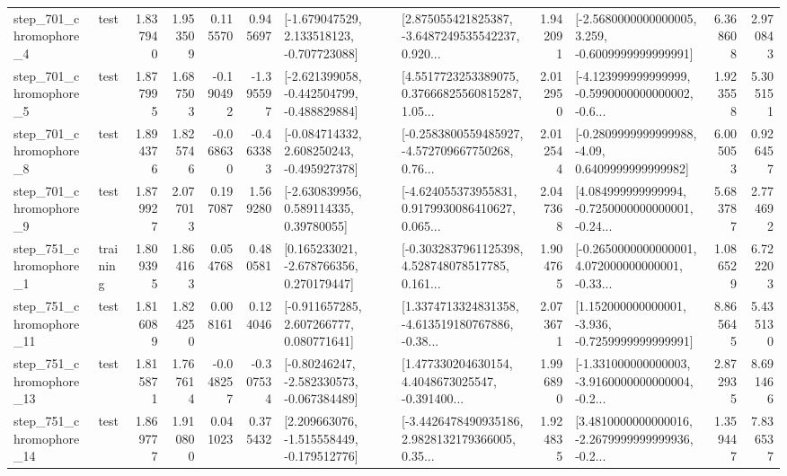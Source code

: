 \begin{tabular}{llrrrrllrlrr}
   step\_701\_chromophore\_4 &      test &      1.837940 &    1.953509 &      0.115570 &  0.945697 &   [-1.679047529, 2.133518123, -0.707723088] &  [2.875055421825387, -3.6487249535542237, 0.920... &       1.942091 &  [-2.5680000000000005, 3.259, -0.6009999999999991] &            6.368608 &          2.970843 \\
   step\_701\_chromophore\_5 &      test &      1.877995 &    1.687503 &     -0.190492 & -1.395597 &  [-2.621399058, -0.442504799, -0.488829884] &  [4.5517723253389075, 0.37666825560815287, 1.05... &       2.012950 &  [-4.123999999999999, -0.5990000000000002, -0.6... &            1.923558 &          5.305151 \\
   step\_701\_chromophore\_8 &      test &      1.894376 &    1.825746 &     -0.068630 & -0.463383 &   [-0.084714332, 2.608250243, -0.495927378] &  [-0.2583800559485927, -4.572709667750268, 0.76... &       2.012544 &   [-0.2809999999999988, -4.09, 0.6409999999999982] &            6.005053 &          0.926457 \\
   step\_701\_chromophore\_9 &      test &      1.879927 &    2.077013 &      0.197087 &  1.569280 &     [-2.630839956, 0.589114335, 0.39780055] &  [-4.624055373955831, 0.9179930086410627, 0.065... &       2.047368 &  [4.084999999999994, -0.7250000000000001, -0.24... &            5.683787 &          2.774692 \\
   step\_751\_chromophore\_1 &  training &      1.809395 &    1.864163 &      0.054768 &  0.480581 &    [0.165233021, -2.678766356, 0.270179447] &  [-0.3032837961125398, 4.528748078517785, 0.161... &       1.904765 &  [-0.2650000000000001, 4.072000000000001, -0.33... &            1.086529 &          6.722203 \\
  step\_751\_chromophore\_11 &      test &      1.816089 &    1.824250 &      0.008161 &  0.124046 &    [-0.911657285, 2.607266777, 0.080771641] &  [1.3374713324831358, -4.613519180767886, -0.38... &       2.073671 &   [1.152000000000001, -3.936, -0.7259999999999991] &            8.865645 &          5.435130 \\
  step\_751\_chromophore\_13 &      test &      1.815871 &    1.767614 &     -0.048257 & -0.307534 &   [-0.80246247, -2.582330573, -0.067384489] &  [1.477330204630154, 4.4048673025547, -0.391400... &       1.996890 &  [-1.331000000000003, -3.9160000000000004, -0.2... &            2.872935 &          8.691466 \\
  step\_751\_chromophore\_14 &      test &      1.869777 &    1.910800 &      0.041023 &  0.375432 &   [2.209663076, -1.515558449, -0.179512776] &  [-3.4426478490935186, 2.9828132179366005, 0.35... &       1.924835 &  [3.4810000000000016, -2.2679999999999936, -0.2... &            1.359447 &          7.836537 \\

\end{tabular}

